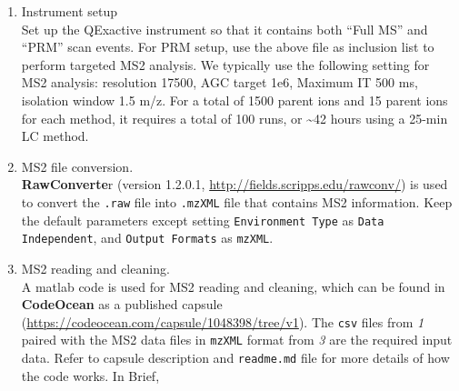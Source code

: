\documentclass[]{article}
\begin{document}
\begin{enumerate}
\def\labelenumi{\arabic{enumi}.}
\setcounter{enumi}{1}
\item
  Instrument setup\\
  Set up the QExactive instrument so that it contains both ``Full MS'' and ``PRM'' scan events. For PRM setup, use the above file as inclusion list to perform targeted MS2 analysis. We typically use the following setting for MS2 analysis: resolution 17500, AGC target 1e6, Maximum IT 500 ms, isolation window 1.5 m/z. For a total of 1500 parent ions and 15 parent ions for each method, it requires a total of 100 runs, or \textasciitilde42 hours using a 25-min LC method.
\item
  MS2 file conversion.\\
  \textbf{RawConverte}r (version 1.2.0.1, \url{http://fields.scripps.edu/rawconv/}) is used to convert the \texttt{.raw} file into \texttt{.mzXML} file that contains MS2 information. Keep the default parameters except setting \texttt{Environment Type} as \texttt{Data Independent}, and \texttt{Output Formats} as \texttt{mzXML}.
\item
  MS2 reading and cleaning.\\
  A matlab code is used for MS2 reading and cleaning, which can be found in \textbf{CodeOcean} as a published capsule (\url{https://codeocean.com/capsule/1048398/tree/v1}). The \texttt{csv} files from \emph{1} paired with the MS2 data files in \texttt{mzXML} format from \emph{3} are the required input data. Refer to capsule description and \texttt{readme.md} file for more details of how the code works. In Brief,


\end{enumerate}
\end{document}
